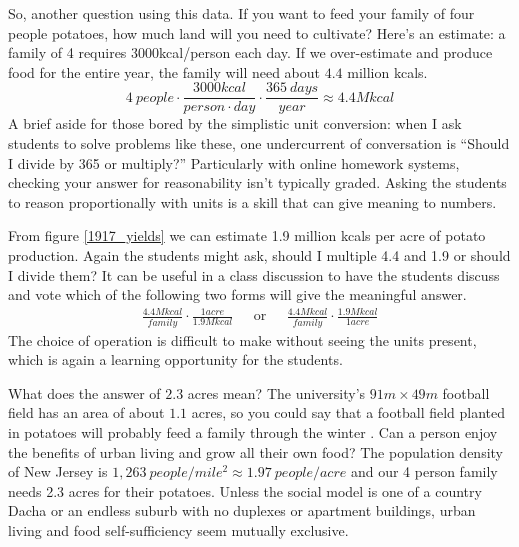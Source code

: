 \documentclass[12pt]{iopart}
\newcommand{\be}{\begin{equation}}
\newcommand{\ee}{\end{equation}}
\newcommand{\bea}{\begin{eqnarray}}
\newcommand{\eea}{\end{eqnarray}}
\begin{document}
So, another question using this data.  If you want to feed your family of four people potatoes, how much land will you need to cultivate?
Here's an estimate: a family of 4 requires 3000kcal/person each day\cite{calorie_age}.  If we over-estimate and produce food for the entire year, the family will need about $4.4$ million kcals.
\be
4~people\cdot\frac{3000kcal}{person\cdot day}\cdot\frac{365~days}{year} \approx 4.4 M kcal 
\ee
A brief aside for those bored by the simplistic unit conversion: when I ask students to solve problems like these, one undercurrent of conversation is ``Should I divide by 365 or multiply?''  Particularly with online homework systems, checking your answer for reasonability isn't  typically graded. Asking the students to reason proportionally with units is a skill that can give meaning to numbers. 

From figure \ref{1917_yields} we can estimate 1.9 million kcals per acre of potato production.  Again the students might ask, should I multiple 4.4 and 1.9 or should I divide them?  It can be useful in a class discussion to have the students discuss and vote which of the following two forms will give the meaningful answer.
\bea
\frac{4.4 M kcal}{family}\cdot\frac{1 acre}{1.9M kcal}  & \textrm{~~or~~}&
\frac{4.4 M kcal}{family}\cdot\frac{1.9M kcal}{1 acre}
\eea
The choice of operation is difficult to make without seeing the units present, which is again a learning opportunity for the students.

What does the answer of $2.3$ acres mean?  The university's $91m\times49m$ football field has an area of about $1.1$ acres, so you could say that a football field planted in potatoes will probably feed a family through the winter \cite{Deppe}.  Can a person enjoy the benefits of urban living and grow all their own food?  The population density of New Jersey is $1,263~people/mile^2 \approx1.97~people/acre$ and our 4 person family needs 2.3 acres for their potatoes.  
Unless the social model is one of a country Dacha or an endless suburb with no duplexes or apartment buildings, urban living and food self-sufficiency seem mutually exclusive.
\end{document}
